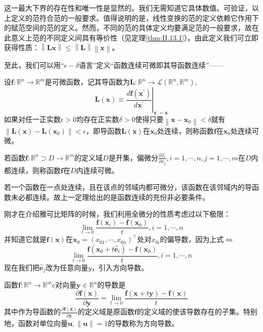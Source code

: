 \documentclass[main.tex]{subfiles}
\begin{document}
这一最大下界的存在性和唯一性是显然的。我们无需知道它具体数值。可验证，以上定义的范符合范的一般要求。值得说明的是，线性变换的范的定义依赖它作用下的赋范空间的范的定义。然而，不同的范的具体定义均要满足范的一般要求，故在此意义上范的不同定义间具有等价性（见定理\ref{thm:II.13.1}）。由此定义我们可立即获得性质：$\left\|\mathbf{Lx}\right\|\leq\left\|\mathbf{L}\right\|\left\|\mathbf{x}\right\|$。

至此，我们可以用“$\epsilon-\delta$语言”定义“函数连续可微即其导函数连续”——

\begin{definition}[连续可微]
设$\mathbf{f}:\mathbb{R}^n\rightarrow\mathbb{R}^m$是可微函数，记其导函数为$\mathbf{L}:\mathbb{R}^n\rightarrow\mathcal{L}\left(\mathbb{R}^n,\mathbb{R}^m\right),$
\[
\mathbf{L}\left(\mathbf{x}\right)\equiv\left.\frac{d\mathbf{f}\left(\mathbf{x}^\prime\right)}{d\mathbf{x}^\prime}\right|_{\mathbf{x^\prime}=\mathbf{x}}
\]
如果对任一正实数$\epsilon>0$均存在正实数$\delta>0$使得只要$\left\|\mathbf{x}-\mathbf{x}_0\right\|<\delta$就有$\left\|\mathbf{L}\left(\mathbf{x}\right)-\mathbf{L}\left(\mathbf{x}_0\right)\right\|<\epsilon$，即导函数$\mathbf{L}\left(\mathbf{x}\right)$在$\mathbf{x}_0$处连续，则称函数$\mathbf{f}$在$\mathbf{x}_0$处连续可微。
\end{definition}

\begin{theorem}
若函数$\mathbf{f}:\mathbb{R}^n\supset D\rightarrow\mathbb{R}^m$的定义域$D$是开集，偏微分$\frac{\partial f_i}{\partial x_j},i=1,\cdots,n,j=1,\cdots,m$在$D$内都连续，则称函数$\mathbf{f}$在$D$内连续可微。
\end{theorem}

若一个函数在一点处连续，且在该点的邻域内都可微分，该函数在该邻域内的导函数未必都连续。故上一定理给出的是函数连续的充份非必要条件。

刚才在介绍雅可比矩阵的时候，我们利用全微分的性质考虑过以下极限：
\[
\lim_{t\to 0}\frac{\mathbf{f}\left(\mathbf{x}_i\right)-\mathbf{f}\left(\mathbf{x}_0\right)}{t},i=1,\cdots,n\]
并知道它就是$\mathbf{f}\left(\mathbf{x}\right)$在$\mathbf{x}_0=\left(x_{01},\cdots,x_{0n}\right)^\intercal$处对$x_{0i}$的偏导数，因为上式$\Leftrightarrow$
\[
\lim_{t\rightarrow 0}\frac{\mathbf{f}\left(\mathbf{x}_0+t\mathbf{\hat{e}}_i\right)-\mathbf{f}\left(\mathbf{x}_0\right)}{t},i=1,\cdots,n
\]
现在我们把$\mathbf{\hat{e}}_j$改为任意向量$y$，引入方向导数。

\begin{definition}
函数$\mathbf{f}:\mathbb{R}^n\rightarrow\mathbb{R}^m$c对向量$\mathbf{y}\in\mathbb{R}^n$的导数是
\[\frac{\partial\mathbf{f}\left(\mathbf{x}\right)}{\partial\mathbf{y}}=\lim_{t\to 0}\frac{\mathbf{f}\left(\mathbf{x}+t\mathbf{y}\right)-\mathbf{f}\left(\mathbf{x}\right)}{t}\]
其中作为导函数的$\frac{\partial \mathbf{f}\left(\mathbf{x}\right)}{\partial\mathbf{y}}$的定义域是原函数$\mathbf{f}$的定义域的使该导数存在的子集。特别地，函数对单位向量$\mathbf{u},\left\|\mathbf{u}\right\|=1$的导数称为方向导数。
\end{definition}
\end{document}

